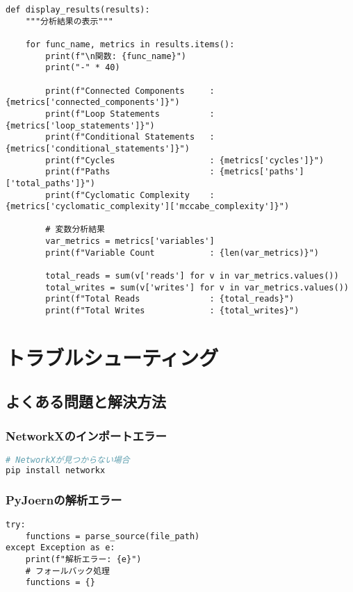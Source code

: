 \documentclass[12pt,a4paper]{article}
\begin{document}
\begin{lstlisting}[caption=結果の表示]
def display_results(results):
    """分析結果の表示"""

    for func_name, metrics in results.items():
        print(f"\n関数: {func_name}")
        print("-" * 40)

        print(f"Connected Components     : {metrics['connected_components']}")
        print(f"Loop Statements          : {metrics['loop_statements']}")
        print(f"Conditional Statements   : {metrics['conditional_statements']}")
        print(f"Cycles                   : {metrics['cycles']}")
        print(f"Paths                    : {metrics['paths']['total_paths']}")
        print(f"Cyclomatic Complexity    : {metrics['cyclomatic_complexity']['mccabe_complexity']}")

        # 変数分析結果
        var_metrics = metrics['variables']
        print(f"Variable Count           : {len(var_metrics)}")

        total_reads = sum(v['reads'] for v in var_metrics.values())
        total_writes = sum(v['writes'] for v in var_metrics.values())
        print(f"Total Reads              : {total_reads}")
        print(f"Total Writes             : {total_writes}")
\end{lstlisting}

\section{トラブルシューティング}

\subsection{よくある問題と解決方法}

\subsubsection{NetworkXのインポートエラー}

\begin{lstlisting}[language=bash]
# NetworkXが見つからない場合
pip install networkx
\end{lstlisting}

\subsubsection{PyJoernの解析エラー}

\begin{lstlisting}[caption=エラーハンドリングの例]
try:
    functions = parse_source(file_path)
except Exception as e:
    print(f"解析エラー: {e}")
    # フォールバック処理
    functions = {}
\end{lstlisting}
\end{document}
